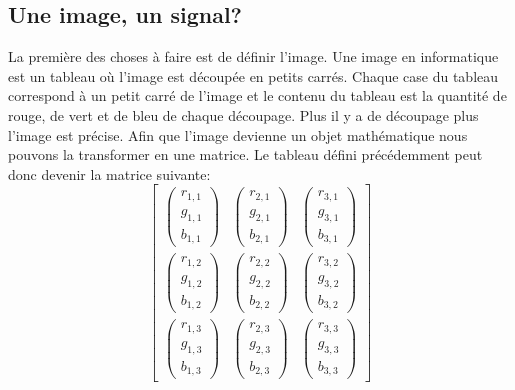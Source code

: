 \documentclass[a4paper,12pt,titlepage]{report}
\begin{document}
		\subsection{Une image, un signal?}	
		La première des choses à faire est de définir l'image. Une image en informatique est un tableau où l'image est découpée en petits carrés. Chaque case du tableau correspond à un petit carré de l'image et le contenu du tableau est la quantité de rouge, de vert et de bleu de chaque découpage. Plus il y a de découpage plus l'image est précise.
		Afin que l'image devienne un objet mathématique nous pouvons la transformer en une matrice. Le tableau défini précédemment peut donc devenir la matrice suivante:
		\begin{equation}
		\begin{bmatrix} 
		\begin{pmatrix} r_{1,1} \\ g_{1,1}\\ b_{1,1} \end{pmatrix} &\begin{pmatrix} r_{2,1} \\ g_{2,1}\\ b_{2,1} \end{pmatrix}&\begin{pmatrix} r_{3,1} \\ g_{3,1}\\ b_{3,1} \end{pmatrix} 
		\\ \begin{pmatrix} r_{1,2} \\ g_{1,2}\\ b_{1,2} \end{pmatrix} & \begin{pmatrix} r_{2,2} \\ g_{2,2}\\ b_{2,2} \end{pmatrix}&\begin{pmatrix} r_{3,2} \\ g_{3,2}\\ b_{3,2} \end{pmatrix}
		\\ \begin{pmatrix} r_{1,3} \\ g_{1,3}\\ b_{1,3} \end{pmatrix} & \begin{pmatrix} r_{2,3} \\ g_{2,3}\\ b_{2,3} \end{pmatrix}&\begin{pmatrix} r_{3,3} \\ g_{3,3}\\ b_{3,3} \end{pmatrix} 
		\end{bmatrix}
		\end{equation}
\end{document}
